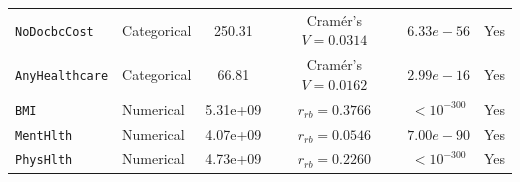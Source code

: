 \begin{table}[htbp]
\begin{tabular}{@{}llcccc@{}}
\texttt{NoDocbcCost} & Categorical & 250.31 & Cram\'{e}r's $V = 0.0314$ & $6.33e-56$ & Yes \\
\texttt{AnyHealthcare} & Categorical & 66.81 & Cram\'{e}r's $V = 0.0162$ & $2.99e-16$ & Yes \\
\texttt{BMI} & Numerical & 5.31e+09 & $r_{rb} = 0.3766$ & $< 10^{-300}$ & Yes \\
\texttt{MentHlth} & Numerical & 4.07e+09 & $r_{rb} = 0.0546$ & $7.00e-90$ & Yes \\
\texttt{PhysHlth} & Numerical & 4.73e+09 & $r_{rb} = 0.2260$ & $< 10^{-300}$ & Yes \\
\bottomrule
\end{tabular}
\end{table}
